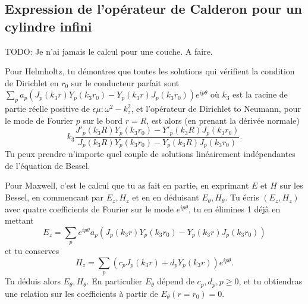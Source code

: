     \subsection{Expression de l'opérateur de Calderon pour un cylindre infini}

        \begin{REM}
            TODO: Je n'ai jamais le calcul pour une couche. A faire.
        \end{REM}
        \begin{REM}
        Pour Helmholtz, tu démontres que toutes les solutions qui vérifient la condition de Dirichlet en \(r_0\) sur le conducteur parfait sont \(\sum_p a_p(J_p(k_3r)Y_p(k_3r_0)-Y_p(k_3r)J_p(k_3r_0))e^{ip\theta}\) où \(k_3\) est la racine de partie réelle positive de \(\epsilon \mu :\omega^2-k_z^2\), et l'opérateur de Dirichlet to Neumann, pour le mode de Fourier \(p\) sur le bord \(r=R\), est alors (en prenant la dérivée normale)
        \[k_3\frac{J'_p(k_3R)Y_p(k_3r_0)-Y'_p(k_3R)J_p(k_3r_0)}{J_p(k_3R)Y_p(k_3r_0)-Y_p(k_3R)J_p(k_3r_0)}.\]
        Tu peux prendre n'importe quel couple de solutions linéairement indépendantes de l'équation de Bessel.
        
        Pour Maxwell, c'est le calcul que tu as fait en partie, en exprimant \(E\) et \(H\) sur les Bessel, en commencant par \(E_z,H_z\) et en en déduisant \(E_{\theta}, H_{\theta}\). Tu écris \((E_z, H_z)\) avec quatre coefficients de Fourier sur le mode \(e^{ip\theta}\), tu en élimines 1 déjà en mettant
        \[E_z=\sum_p e^{ip\theta}a_p(J_p(k_3r)Y_p(k_3r_0)-Y_p(k_3r)J_p(k_3r_0))\]
        et tu conserves
        \[H_z=\sum_p (c_pJ_p(k_3r)+d_pY_p(k_3r))e^{ip\theta}.\]
        Tu déduis alors \(E_{\theta}, H_{\theta}\). En particulier \(E_{\theta}\) dépend de \(c_p, d_p, p\geq 0\), et tu obtiendras une relation sur les coefficients à partir de \(E_{\theta}(r=r_0)=0\). 
        \end{REM}


